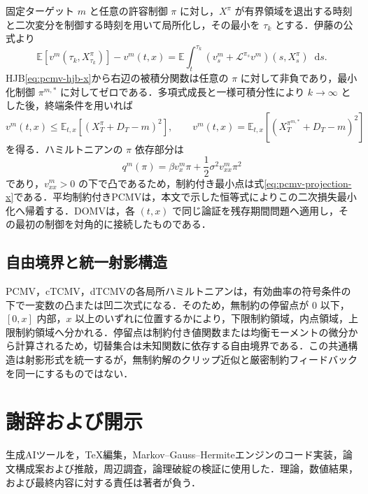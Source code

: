 \documentclass[10pt,a4paper]{article}
\theoremstyle{plain}
\theoremstyle{definition}
\newcommand{\E}{\mathbb{E}}
\newcommand{\Lop}{\mathcal{L}}
\newcommand{\dd}{\mathop{}\!\mathrm{d}}
\begin{document}
固定ターゲット $m$ と任意の許容制御 $\pi$ に対し，$X^\pi$ が有界領域を退出する時刻と二次変分を制御する時刻を用いて局所化し，その最小を $\tau_k$ とする．伊藤の公式より
\begin{equation}
 \E[v^m(\tau_k,X_{\tau_k}^\pi)]-v^m(t,x)
 =\E\int_t^{\tau_k}
 \left(v_s^m+\Lop^{\pi_s}v^m\right)(s,X_s^\pi)\dd s.
 \label{eq:app-pcmv-ito}
\end{equation}
HJB\eqref{eq:pcmv-hjb-x}から右辺の被積分関数は任意の $\pi$ に対して非負であり，最小化制御 $\pi^{m,*}$ に対してゼロである．多項式成長と一様可積分性により $k\to\infty$ とした後，終端条件を用いれば
\[
 v^m(t,x)\leq \E_{t,x}[(X_T^\pi+D_T-m)^2],
 \qquad
 v^m(t,x)=\E_{t,x}[(X_T^{\pi^{m,*}}+D_T-m)^2]
\]
を得る．ハミルトニアンの $\pi$ 依存部分は
\[
 q^m(\pi)=\beta v_x^m\pi+\frac12\sigma^2v_{xx}^m\pi^2
\]
であり，$v_{xx}^m>0$ の下で凸であるため，制約付き最小点は式\eqref{eq:pcmv-projection-x}である．平均制約付きPCMVは，本文で示した恒等式によりこの二次損失最小化へ帰着する．DOMVは，各 $(t,x)$ で同じ論証を残存期間問題へ適用し，その最初の制御を対角的に接続したものである．

\subsection*{自由境界と統一射影構造}

PCMV，cTCMV，dTCMVの各局所ハミルトニアンは，有効曲率の符号条件の下で一変数の凸または凹二次式になる．そのため，無制約の停留点が $0$ 以下，$[0,x]$ 内部，$x$ 以上のいずれに位置するかにより，下限制約領域，内点領域，上限制約領域へ分かれる．停留点は制約付き値関数または均衡モーメントの微分から計算されるため，切替集合は未知関数に依存する自由境界である．この共通構造は射影形式を統一するが，無制約解のクリップ近似と厳密制約フィードバックを同一にするものではない．


\section*{謝辞および開示}
生成AIツールを，TeX編集，Markov--Gauss--Hermiteエンジンのコード実装，論文構成案および推敲，周辺調査，論理破綻の検証に使用した．理論，数値結果，および最終内容に対する責任は著者が負う．
\end{document}
